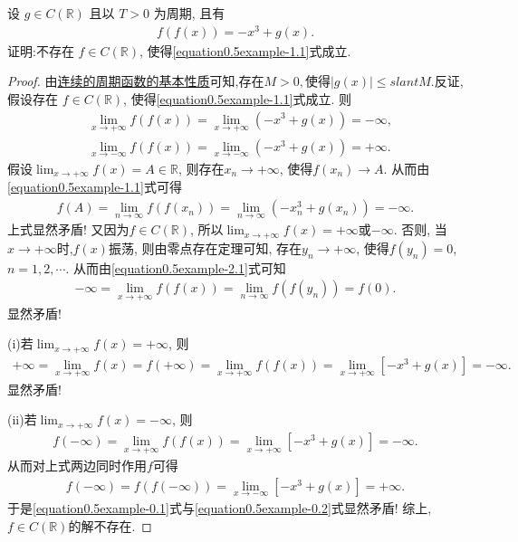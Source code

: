\documentclass[../../main.tex]{subfiles}
\begin{document}
\begin{example}
设 \(g\in C(\mathbb{R})\) 且以 \(T > 0\) 为周期, 且有
\begin{align}
f(f(x))=-x^3 + g(x).\label{equation0.5example-1.1}
\end{align}
证明:不存在 \(f\in C(\mathbb{R})\), 使得\eqref{equation0.5example-1.1}式成立. 
\end{example}
\begin{proof}
由\hyperref[proposition:连续的周期函数的基本性质]{连续的周期函数的基本性质}可知,存在$M>0,$使得$|g(x)|\leqslant slant M.$反证,假设存在 \(f\in C(\mathbb{R})\), 使得\eqref{equation0.5example-1.1}式成立. 则
\begin{align}
&\underset{x\rightarrow +\infty}{\lim}f\left( f\left( x \right) \right) =\underset{x\rightarrow +\infty}{\lim}\left( -x^3+g\left( x \right) \right) =-\infty ,\label{equation0.5example-2.1}
\\
&\underset{x\rightarrow -\infty}{\lim}f\left( f\left( x \right) \right) =\underset{x\rightarrow -\infty}{\lim}\left( -x^3+g\left( x \right) \right) =+\infty .\label{equation0.5example-2.2}
\end{align}
假设\(\lim_{x\rightarrow +\infty}f(x) = A\in \mathbb{R}\), 则存在\(x_n\rightarrow +\infty\), 使得\(f(x_n)\rightarrow A\). 从而由\eqref{equation0.5example-1.1}式可得
\begin{align*}
f(A) = \lim_{n\rightarrow \infty}f(f(x_n)) = \lim_{n\rightarrow \infty}(-x_{n}^{3}+g(x_n)) = -\infty.
\end{align*}
上式显然矛盾! 又因为\(f\in C(\mathbb{R})\), 所以\(\lim_{x\rightarrow +\infty}f(x) = +\infty\)或\(-\infty\).
否则, 当\(x\rightarrow +\infty\)时,\(f(x)\)振荡, 则由零点存在定理可知, 存在\(y_n\rightarrow +\infty\), 使得\(f(y_n) = 0\), \(n = 1,2,\cdots\).
从而由\eqref{equation0.5example-2.1}式可知
\begin{align*}
-\infty = \lim_{x\rightarrow +\infty}f(f(x)) = \lim_{n\rightarrow \infty}f(f(y_n)) = f(0).
\end{align*}
显然矛盾!

(i)若\(\lim_{x\rightarrow +\infty}f(x) = +\infty\), 则
\begin{align*}
+\infty = \lim_{x\rightarrow +\infty}f(x) = f(+\infty) = \lim_{x\rightarrow +\infty}f(f(x)) = \lim_{x\rightarrow +\infty}[-x^3 + g(x)] = -\infty.
\end{align*}
显然矛盾!

(ii)若\(\lim_{x\rightarrow +\infty}f(x) = -\infty\), 则
\begin{align}
f(-\infty) = \lim_{x\rightarrow +\infty}f(f(x)) = \lim_{x\rightarrow +\infty}[-x^3 + g(x)] = -\infty. \label{equation0.5example-0.1}
\end{align}
从而对上式两边同时作用\(f\)可得
\begin{align}
f(-\infty) = f(f(-\infty)) = \lim_{x\rightarrow -\infty}[-x^3 + g(x)] = +\infty. \label{equation0.5example-0.2}
\end{align}
于是\eqref{equation0.5example-0.1}式与\eqref{equation0.5example-0.2}式显然矛盾!
综上,\(f\in C(\mathbb{R})\)的解不存在. 
\end{proof}
\end{document}
